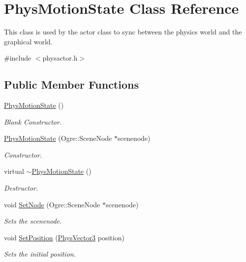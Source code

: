 \hypertarget{classPhysMotionState}{
\section{PhysMotionState Class Reference}
\label{d2/d14/classPhysMotionState}
}


This class is used by the actor class to sync between the physics world and the graphical world.  


{\ttfamily \#include $<$physactor.h$>$}\subsection*{Public Member Functions}
\begin{DoxyCompactItemize}
\item 
\hyperlink{classPhysMotionState_a8439c3835b9d96b0b1b285126df41a42}{PhysMotionState} ()
\begin{DoxyCompactList}\small\item\em Blank Constructor. \item\end{DoxyCompactList}\item 
\hyperlink{classPhysMotionState_a9c315b85bc405a36a6bd9d9a9f68c34a}{PhysMotionState} (Ogre::SceneNode $\ast$scenenode)
\begin{DoxyCompactList}\small\item\em Constructor. \item\end{DoxyCompactList}\item 
virtual \hyperlink{classPhysMotionState_a74441aa0ba9a1b99ee1662b2eee9db3c}{$\sim$PhysMotionState} ()
\begin{DoxyCompactList}\small\item\em Destructor. \item\end{DoxyCompactList}\item 
void \hyperlink{classPhysMotionState_a4ba21f0b58f33197b61cf1a9754027bc}{SetNode} (Ogre::SceneNode $\ast$scenenode)
\begin{DoxyCompactList}\small\item\em Sets the scenenode. \item\end{DoxyCompactList}\item 
void \hyperlink{classPhysMotionState_aa2fa4f107147626cd33d42fd3fbe178b}{SetPosition} (\hyperlink{classPhysVector3}{PhysVector3} position)
\begin{DoxyCompactList}\small\item\em Sets the initial position. \item\end{DoxyCompactList}\item 

\end{DoxyCompactItemize}
